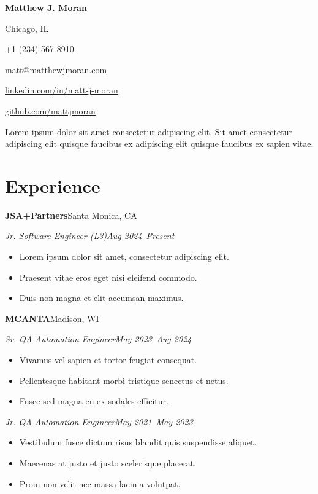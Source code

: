 \documentclass[11pt]{article}
\newcommand{\summary}[1]{%
  #1\par
  \addvspace{2.5ex}
}
\newcommand{\organization}[2]{%
  \textbf{#1}\hfill#2\par
}
\newcommand{\role}[2]{%
  \emph{\small #1}\hfill\emph{\small #2}\par
}
\begin{document}
\begin{center}
  {\huge\textbf{Matthew J. Moran}}\\[0.25\baselineskip]
  \small
  \begin{info}
    \item Chicago, IL
    \item \href{tel:+12345678910}{+1 (234) 567-8910}
    \item \href{mailto:matt@matthewjmoran.com}{matt@matthewjmoran.com}
    \item \href{https://www.linkedin.com/in/matt-j-moran}{linkedin.com/in/matt-j-moran}
    \item \href{https://github.com/mattjmoran}{github.com/mattjmoran}
  \end{info}
\end{center}

\summary{
  Lorem ipsum dolor sit amet consectetur adipiscing elit.
  Sit amet consectetur adipiscing elit quisque faucibus ex adipiscing elit quisque faucibus ex sapien vitae.
}

\section{Experience}

\organization{JSA+Partners}{Santa Monica, CA}
\role{Jr. Software Engineer (L3)}{Aug 2024--Present}
\begin{itemize}
  \item Lorem ipsum dolor sit amet, consectetur adipiscing elit.
  \item Praesent vitae eros eget nisi eleifend commodo.
  \item Duis non magna et elit accumsan maximus.
\end{itemize}

\organization{MCANTA}{Madison, WI}
\role{Sr. QA Automation Engineer}{May 2023--Aug 2024}
\begin{itemize}
  \item Vivamus vel sapien et tortor feugiat consequat.
  \item Pellentesque habitant morbi tristique senectus et netus.
  \item Fusce sed magna eu ex sodales efficitur.
\end{itemize}

\role{Jr. QA Automation Engineer}{May 2021--May 2023}
\begin{itemize}
  \item Vestibulum fusce dictum risus blandit quis suspendisse aliquet.
  \item Maecenas at justo et justo scelerisque placerat.
  \item Proin non velit nec massa lacinia volutpat.
\end{itemize}
\end{document}
